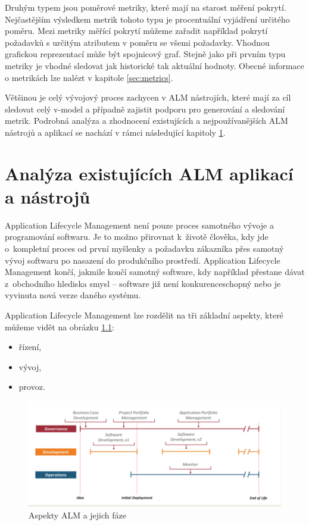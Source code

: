 \documentclass[czech,master]{diploma}
\begin{document}
Druhým typem jsou poměrové metriky, které mají na starost měření pokrytí. Nejčastějším výsledkem metrik tohoto typu je procentuální vyjádření určitého poměru. Mezi metriky měřící pokrytí můžeme zařadit například pokrytí požadavků s určitým atributem v poměru se všemi požadavky. Vhodnou grafickou reprezentací může být spojnicový graf. Stejně jako při prvním typu metriky je vhodné sledovat jak historické tak aktuální hodnoty. Obecné informace o metrikách lze nalézt v kapitole \ref{sec:metrics}.

Většinou je celý vývojový proces zachycen v ALM nástrojích, které mají za cíl sledovat celý v-model a případně zajistit podporu pro generování a sledování metrik. Podrobná analýza a zhodnocení existujících a nejpoužívanějších ALM nástrojů a aplikací se nachází v rámci následující kapitoly \ref{sec:alm}.


\chapter{Analýza existujících ALM aplikací a nástrojů}
\label{sec:alm}
Application Lifecycle Management není pouze proces samotného vývoje a programování softwaru. Je to možno přirovnat k~životě člověka, kdy jde o~kompletní proces od první myšlenky a požadavku zákazníka přes samotný vývoj softwaru po nasazení do produkčního prostředí. Application Lifecycle Management končí, jakmile končí samotný software, kdy například přestane dávat z~obchodního hlediska smysl -- software již není konkurenceschopný nebo je vyvinuta nová verze daného systému. \cite{alm_chappell}

Application Lifecycle Management lze rozdělit na tři základní aspekty, které můžeme vidět na obrázku \ref{fig:alm}:

\begin{itemize}
  \item řízení,
  \item vývoj,
  \item provoz.
\end{itemize}

\begin{figure}[!ht]
    \centering
    \includegraphics[width=1\textwidth]{Diplomka/Figures/alm.png}
    \caption{Aspekty ALM a jejich fáze \cite{alm_chappell}}
    \label{fig:alm}
\end{figure}
\end{document}
